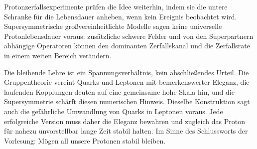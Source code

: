 Protonzerfallsexperimente prüfen die Idee weiterhin, indem sie die untere Schranke für die Lebensdauer anheben, wenn kein Ereignis beobachtet wird. Supersymmetrische großvereinheitlichte Modelle sagen keine universelle Protonlebensdauer voraus: zusätzliche schwere Felder und von den Superpartnern abhängige Operatoren können den dominanten Zerfallskanal und die Zerfallsrate in einem weiten Bereich verändern.


Die bleibende Lehre ist ein Spannungsverhältnis, kein abschließendes Urteil. Die Gruppentheorie vereint Quarks und Leptonen mit bemerkenswerter Eleganz, die laufenden Kopplungen deuten auf eine gemeinsame hohe Skala hin, und die Supersymmetrie schärft diesen numerischen Hinweis. Dieselbe Konstruktion sagt auch die gefährliche Umwandlung von Quarks in Leptonen voraus. Jede erfolgreiche Version muss daher die Eleganz bewahren und zugleich das Proton für nahezu unvorstellbar lange Zeit stabil halten. Im Sinne des Schlussworts der Vorlesung: Mögen all unsere Protonen stabil bleiben.
